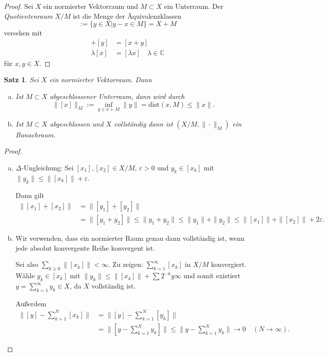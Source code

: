 \documentclass[
paper=a4,
bibtotocnumbered,
liststotocnumbered,
tablecaptionabove,
pointlessnumbers,
twoside,
openright,
10pt
]
{report}
\newcommand{\dist}{\mathrm{dist}}
\newtheorem{satz}[thm]{Satz}
\theoremstyle{definition}
\numberwithin{equation}{chapter}
\begin{document}
\begin{proof}
Sei $X$ ein normierter Vektorraum und $M\subset X$ ein Unterraum. Der \emph{Quotientenraum} $X/M$ ist die Menge der Äquivalenzklassen
\begin{equation}
[x] := \{y\in X| y-x\in M\} = X+M
\end{equation}
versehen mit
\begin{align*}
[x] + [y] &= [x+y]\\
\lambda[x] &= [\lambda x] \quad \lambda \in \mathbb C
\end{align*}
für $x,y\in X$.
\end{proof}

\begin{satz}\label{4.9}
Sei $X$ ein normierter Vektorraum. Dann 
\begin{enumerate}[a)]
\item Ist $M\subset X$ abgeschlossener Unterraum, dann wird durch
\begin{equation}
\| [x] \|_M := \inf_{y\in x+M} \| y\|= \dist(x,M)\le \|x\|.
\end{equation}
\item Ist $M\subset X$ abgeschlossen und $X$ vollständig dann ist $(X/M, \| \cdot \|_M)$ ein Banachraum.
\end{enumerate}
\end{satz}
\begin{proof}
\begin{enumerate}[a)]
\item $\Delta$-Ungleichung: Sei $[x_1], [x_2] \in X/M$, $\varepsilon>0$ und $y_k \in [x_k]$ mit $\| y_k \| \le \| [x_k] \| + \varepsilon$.

Dann gilt
\begin{align*}
\| [x_1 ] + [x_2] \| &= \| [y_1] + [y_2]\|\\
&= \| [y_1 + y_2] \| \le \| y_1 + y_2\| \le \| y_1\| + \|y_2\| \le \| [x_1] \| + \| [x_2] \| + 2\varepsilon.
\end{align*}
\item Wir verwenden, dass ein normierter Raum genau dann vollständig ist, wenn jede absolut konvergente Reihe konvergent ist.

Sei also $\sum_{k\ge 0} \| [x_k] \| <\infty$. Zu zeigen: $\sum_{k=1}^\infty [x_k]$ in $X/M$ konvergiert. Wähle $y_k\in [x_k]$ mit $\| y_k\| \le \| [x_k]\| + \sum 2^{-k} y\infty$ und somit existiert $y= \sum_{k=1}^\infty y_k \in X$, da $X$ vollständig ist.

Außerdem
\begin{align*}
\| [y] - \sum_{k=1}^N [x_k] \| &= \| [y] - \sum_{k=1}^N [y_k] \| \\
&= \| [y-\sum_{k=1}^N y_k] \| \le \| y- \sum_{k=1}^N y_k \| \to 0\quad (N\to \infty).
\end{align*}
\end{enumerate}
\end{proof}
\end{document}
